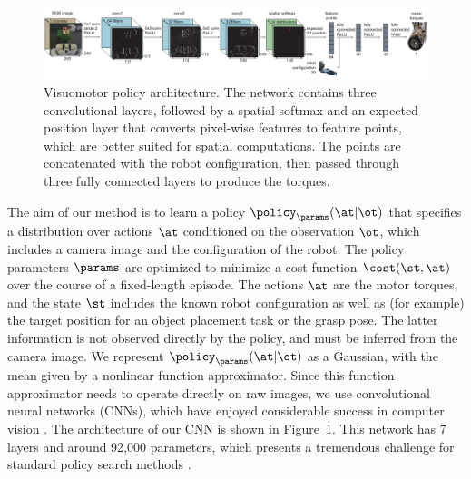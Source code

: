 \documentclass[conference]{IEEEtran}
\begin{document}
\begin{figure}[t]
\centering
\includegraphics[width=\textwidth]{imgs/network_diagram.pdf}
\vspace{-0.3in}
\caption{Visuomotor policy architecture. The network contains three convolutional layers, followed by a spatial softmax and an expected position layer that converts pixel-wise features to feature points, which are better suited for spatial computations. The points are concatenated with the robot configuration, then passed through three fully connected layers to produce the torques.
}
\vspace{-0.15in}
\label{fig:nn}
\end{figure}

The aim of our method is to learn a policy $\policy_\params(\at|\ot)$ that specifies a distribution over actions $\at$ conditioned on the observation $\ot$, which includes a camera image and the configuration of the robot. The policy parameters $\params$ are optimized to minimize a cost function $\cost(\st,\at)$ over the course of a fixed-length episode. The actions $\at$ are the motor torques, and the state $\st$ includes the known robot configuration as well as (for example) the target position for an object placement task or the grasp pose. The latter information is not observed directly by the policy, and must be inferred from the camera image. We represent $\policy_\params(\at|\ot)$ as a Gaussian, with the mean given by a nonlinear function approximator. Since this function approximator needs to operate directly on raw images, we use convolutional neural networks (CNNs), which have enjoyed considerable success in computer vision \cite{ksh-incdc-12}. The architecture of our CNN is shown in Figure~\ref{fig:nn}. This network has 7 layers and around 92,000 parameters, which presents a tremendous challenge for standard policy search methods \cite{dnp-spsr-13}.
\end{document}
